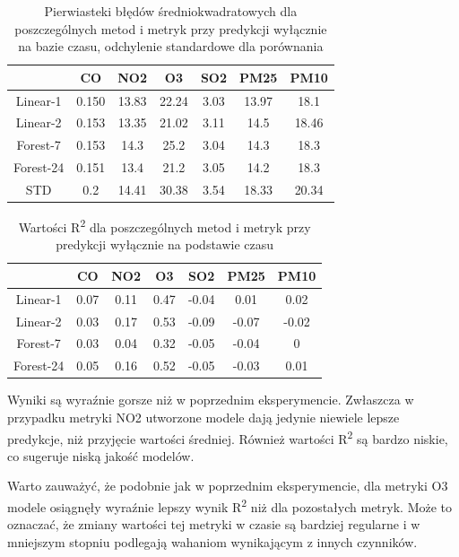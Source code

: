 \documentclass[18pt, letterpaper]{article}
\begin{document}
\begin{table}[H]
\centering
\begin{tabular}{|c|c|c|c|c|c|c|}
\hline
          & CO    & NO2   & O3    & SO2  & PM25  & PM10  \\ \hline
Linear-1  & 0.150 & 13.83 & 22.24 & 3.03 & 13.97 & 18.1  \\ \hline
Linear-2  & 0.153 & 13.35 & 21.02 & 3.11 & 14.5  & 18.46 \\ \hline
Forest-7  & 0.153 & 14.3  & 25.2  & 3.04 & 14.3  & 18.3  \\ \hline
Forest-24 & 0.151 & 13.4  & 21.2  & 3.05 & 14.2  & 18.3  \\ \hline
STD       & 0.2   & 14.41 & 30.38 & 3.54 & 18.33 & 20.34 \\ \hline
\end{tabular}
\caption{Pierwiasteki błędów średniokwadratowych dla poszczególnych metod i metryk przy predykcji wyłącznie na bazie czasu, odchylenie standardowe dla porównania}
\label{table:time_only_time_results}
\end{table}

\begin{table}[H]
\centering
\begin{tabular}{|c|c|c|c|c|c|c|}
\hline
           & CO   & NO2  & O3   & SO2   & PM25  & PM10  \\ \hline
Linear-1  & 0.07 & 0.11 & 0.47 & -0.04 & 0.01  & 0.02  \\ \hline
Linear-2  & 0.03 & 0.17 & 0.53 & -0.09 & -0.07 & -0.02 \\ \hline
Forest-7  & 0.03 & 0.04 & 0.32 & -0.05 & -0.04 & 0     \\ \hline
Forest-24 & 0.05 & 0.16 & 0.52 & -0.05 & -0.03 & 0.01  \\ \hline
\end{tabular}
\caption{Wartości R\textsuperscript{2} dla poszczególnych metod i metryk przy predykcji wyłącznie na podstawie czasu}
\label{table:time_only_results_r2}
\end{table}


Wyniki są wyraźnie gorsze niż w poprzednim eksperymencie. Zwłaszcza w przypadku metryki NO2 utworzone modele dają jedynie niewiele lepsze predykcje, niż przyjęcie wartości średniej. Również wartości R\textsuperscript{2} są bardzo niskie, co sugeruje niską jakość modelów.

Warto zauważyć, że podobnie jak w poprzednim eksperymencie, dla metryki O3 modele osiągnęły wyraźnie lepszy wynik R\textsuperscript{2} niż dla pozostałych metryk. Może to oznaczać, że zmiany wartości tej metryki w czasie są bardziej regularne i w mniejszym stopniu podlegają wahaniom wynikającym z innych czynników.
\end{document}

